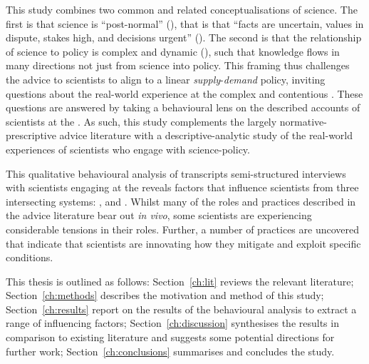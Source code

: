 This study combines two common and related conceptualisations of \CAN{} science. The first is that \CAN{} science is ``post-normal'' (\cite{FuntowiczR1993,Gluckman2014}), that is that ``facts are uncertain, values in dispute, stakes high, and decisions urgent'' (\cite[p649]{Ravetz1999}). The second is that the relationship of \CAN{} science to \CAN{} policy is complex and dynamic (\cite{StrassheimK2014,BoswellS2017}), such that knowledge flows in many directions not just from science into policy. This framing thus challenges the advice to scientists to align to a linear \emph{supply}-\emph{demand} policy, inviting questions about the real-world experience at the complex and contentious \CAN{} \SPI. These questions are answered by taking a behavioural lens on the described accounts of scientists at the \CAN{} \SPI. As such, this study complements the largely normative-prescriptive advice literature with a descriptive-analytic study of the real-world experiences of scientists who engage with \CAN{} science-policy.

This qualitative behavioural analysis of transcripts semi-structured interviews with scientists engaging at the \CAN{} \SPI{} reveals factors that influence scientists from three intersecting systems: \inte, \know{} and \scip. Whilst many of the roles and practices described in the advice literature bear out \emph{in vivo}, some scientists are experiencing considerable tensions in their roles. Further, a number of practices are uncovered that indicate that scientists are innovating how they mitigate and exploit specific conditions. 

This thesis is outlined as follows: Section~\ref{ch:lit} reviews the relevant literature; Section~\ref{ch:methods} describes the motivation and method of this study; Section~\ref{ch:results} report on the results of the behavioural analysis to extract a range of influencing factors; Section~\ref{ch:discussion} synthesises the results in comparison to existing literature and suggests some potential directions for further work; Section~\ref{ch:conclusions} summarises and concludes the study.

